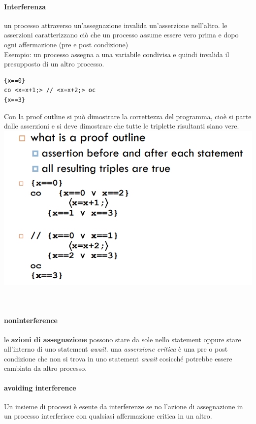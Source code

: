 \documentclass[10pt,a4paper]{book}
\begin{document}
\paragraph{Interferenza} un processo attraverso un'assegnazione invalida un'asserzione nell'altro.
le asserzioni caratterizzano ciò che un processo assume essere vero prima e dopo ogni affermazione (pre e post condizione)\\
Esempio: un processo assegna a una variabile condivisa e quindi invalida il presupposto di un altro processo.
\begin{verbatim}
{x==0}
co <x=x+1;> // <x=x+2;> oc
{x==3}
\end{verbatim}

Con la proof outline si può dimostrare la correttezza del programma, cioè si parte dalle asserzioni e si deve dimostrare che tutte le triplette risultanti siano vere.
\includegraphics[scale=0.45]{img/proof.png} \\ \\ \\

\paragraph{noninterference}
le \textbf{azioni di assegnazione} possono stare da sole nello statement oppure stare all'interno di uno statement \textit{await}.
una \textit{asserzione critica} è una pre o post condizione che non si trova in uno statement \textit{await} cosicché potrebbe essere cambiata da altro processo.

\paragraph{avoiding interference}
Un insieme di processi è esente da interferenze se no l'azione di assegnazione in un processo interferisce con qualsiasi affermazione critica in un altro.
\end{document}
